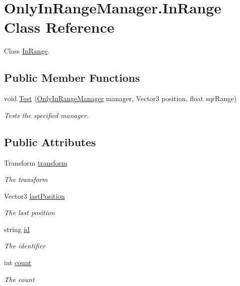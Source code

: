 \hypertarget{class_only_in_range_manager_1_1_in_range}{}\section{Only\+In\+Range\+Manager.\+In\+Range Class Reference}
\label{class_only_in_range_manager_1_1_in_range}


Class \hyperlink{class_only_in_range_manager_1_1_in_range}{In\+Range}.  


\subsection*{Public Member Functions}
\begin{DoxyCompactItemize}
\item 
void \hyperlink{class_only_in_range_manager_1_1_in_range_a80c40fca70b79239c1a9b2b17a8c7d35}{Test} (\hyperlink{class_only_in_range_manager}{Only\+In\+Range\+Manager} manager, Vector3 position, float sqr\+Range)
\begin{DoxyCompactList}\small\item\em Tests the specified manager. \end{DoxyCompactList}\end{DoxyCompactItemize}
\subsection*{Public Attributes}
\begin{DoxyCompactItemize}
\item 
Transform \hyperlink{class_only_in_range_manager_1_1_in_range_ab5c9e0831b39bb97780c2d86b308af6a}{transform}
\begin{DoxyCompactList}\small\item\em The transform \end{DoxyCompactList}\item 
Vector3 \hyperlink{class_only_in_range_manager_1_1_in_range_adde7399e58b8628d670e63a4ed88f2c8}{last\+Position}
\begin{DoxyCompactList}\small\item\em The last position \end{DoxyCompactList}\item 
string \hyperlink{class_only_in_range_manager_1_1_in_range_a54aab3244d567e3c6caa9640c61f58e4}{id}
\begin{DoxyCompactList}\small\item\em The identifier \end{DoxyCompactList}\item 
int \hyperlink{class_only_in_range_manager_1_1_in_range_a892ad3f61f37dcd0ece666f6afbd2ede}{count}
\begin{DoxyCompactList}\small\item\em The count \end{DoxyCompactList}\end{DoxyCompactItemize}
